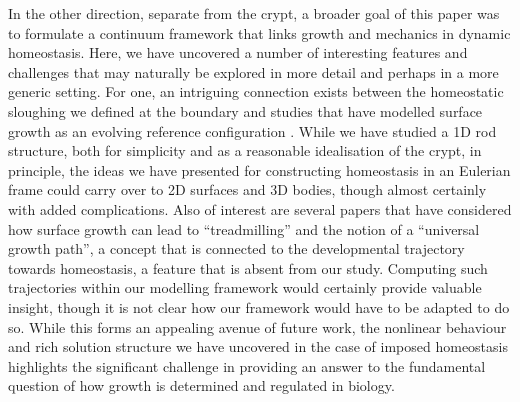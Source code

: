 In the other direction, separate from the crypt, a broader goal of this paper was to formulate a continuum framework that links growth and mechanics in dynamic homeostasis. Here, we have uncovered a number of interesting features and challenges that may naturally be explored in more detail and perhaps in a more generic setting. For one, an intriguing connection exists between the homeostatic sloughing we defined at the boundary and studies that have modelled surface growth as an evolving reference configuration \cite{zurlo2017printing, zurlo2018inelastic, truskinovsky2019nonlinear}. While we have studied a 1D rod structure, both for simplicity and as a reasonable idealisation of the crypt, in principle, the ideas we have presented for constructing homeostasis in an Eulerian frame could carry over to 2D surfaces and 3D bodies, though almost certainly with added complications.
Also of interest are several papers \cite{tomassetti2016steady, abi2019kinetics, abi2020surface, abeyaratne2020treadmilling} that have considered how surface growth can lead to ``treadmilling'' and the notion of a ``universal growth path'', a concept that is connected to the developmental trajectory towards homeostasis, a feature that is absent from our study. Computing such trajectories within our modelling framework would certainly provide valuable insight, though it is not clear how our framework would have to be adapted to do so. While this forms an appealing avenue of future work, the nonlinear behaviour and rich solution structure we have uncovered in the case of imposed homeostasis highlights the significant challenge in providing an answer to the fundamental question of how growth is determined and regulated in biology.

